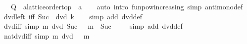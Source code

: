 \begin{isabellebody}
\ \ \ Q\ {\isacharcolon}{\kern0pt}{\isacharcolon}{\kern0pt}\ {\isachardoublequoteopen}{\isacharprime}{\kern0pt}a{\isacharcolon}{\kern0pt}{\isacharcolon}{\kern0pt}{\isacharbraceleft}{\kern0pt}lattice{\isacharcomma}{\kern0pt}order{\isacharunderscore}{\kern0pt}top{\isacharbraceright}{\kern0pt}\ {\isasymRightarrow}\ {\isacharprime}{\kern0pt}a{\isachardoublequoteclose}\isanewline
%
\isadelimproof
\ \ %
\endisadelimproof
%
\isatagproof
{}\isamarkupfalse%
\ {\isacharparenleft}{\kern0pt}auto\ intro{\isacharbang}{\kern0pt}{\isacharcolon}{\kern0pt}\ funpow{\isacharunderscore}{\kern0pt}increasing\ simp{\isacharcolon}{\kern0pt}\ antimono{\isacharunderscore}{\kern0pt}def{\isacharparenright}{\kern0pt}%
\endisatagproof
{\isafoldproof}%
%
\isadelimproof
%
\endisadelimproof
%
\isadelimdocument
%
\endisadelimdocument
%
\isatagdocument
%
\isamarkuptrue%
%
\endisatagdocument
{\isafolddocument}%
%
\isadelimdocument
%
\endisadelimdocument
{}\isamarkupfalse%
\ dvd{\isacharunderscore}{\kern0pt}{}{\isacharunderscore}{\kern0pt}left\ {\isacharbrackleft}{\kern0pt}iff{\isacharbrackright}{\kern0pt}{\isacharcolon}{\kern0pt}\ {\isachardoublequoteopen}Suc\ {}\ dvd\ k{\isachardoublequoteclose}\isanewline
%
\isadelimproof
\ \ %
\endisadelimproof
%
\isatagproof
{}\isamarkupfalse%
\ {\isacharparenleft}{\kern0pt}simp\ add{\isacharcolon}{\kern0pt}\ dvd{\isacharunderscore}{\kern0pt}def{\isacharparenright}{\kern0pt}%
\endisatagproof
{\isafoldproof}%
%
\isadelimproof
\isanewline
%
\endisadelimproof
\isanewline
{}\isamarkupfalse%
\ dvd{\isacharunderscore}{\kern0pt}{}{\isacharunderscore}{\kern0pt}iff{\isacharunderscore}{\kern0pt}{}\ {\isacharbrackleft}{\kern0pt}simp{\isacharbrackright}{\kern0pt}{\isacharcolon}{\kern0pt}\ {\isachardoublequoteopen}m\ dvd\ Suc\ {}\ {\isasymlongleftrightarrow}\ m\ {\isacharequal}{\kern0pt}\ Suc\ {}{\isachardoublequoteclose}\isanewline
%
\isadelimproof
\ \ %
\endisadelimproof
%
\isatagproof
{}\isamarkupfalse%
\ {\isacharparenleft}{\kern0pt}simp\ add{\isacharcolon}{\kern0pt}\ dvd{\isacharunderscore}{\kern0pt}def{\isacharparenright}{\kern0pt}%
\endisatagproof
{\isafoldproof}%
%
\isadelimproof
\isanewline
%
\endisadelimproof
\isanewline
{}\isamarkupfalse%
\ nat{\isacharunderscore}{\kern0pt}dvd{\isacharunderscore}{\kern0pt}{}{\isacharunderscore}{\kern0pt}iff{\isacharunderscore}{\kern0pt}{}\ {\isacharbrackleft}{\kern0pt}simp{\isacharbrackright}{\kern0pt}{\isacharcolon}{\kern0pt}\ {\isachardoublequoteopen}m\ dvd\ {}\ {\isasymlongleftrightarrow}\ m\ {\isacharequal}{\kern0pt}\ {}{\isachardoublequoteclose}\isanewline

\end{isabellebody}
